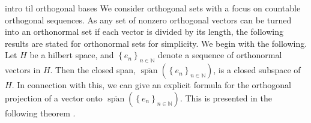 \documentclass[../thesis.tex]{subfiles}
\begin{document}
intro til orthogonal bases 
%
%
We consider orthogonal sets with a focus on countable orthogonal sequences. As any set of nonzero orthogonal vectors can be turned into an orthonormal set if each vector is divided by its length, the following results are stated for orthonormal sets for simplicity. 
We begin with the following. Let $H$ be a hilbert space, and $\left\{ e_{n} \right\}_{n\in \mathbb{N}}$ denote a sequence of orthonormal vectors in $H$. Then the closed span, $\overline{\operatorname{span}}\left( \left\{ e_{n} \right\}_{n\in \mathbb{N}} \right)$, is a closed subspace of $H$. In connection with this, we can give an explicit formula for the orthogonal projection of a vector onto $\overline{\operatorname{span}}\left( \left\{ e_{n} \right\}_{n\in \mathbb{N}} \right)$. This is presented in the following theorem \cite[p.~210]{heilMetricsNormsInner2018}.
%
%
\end{document}
